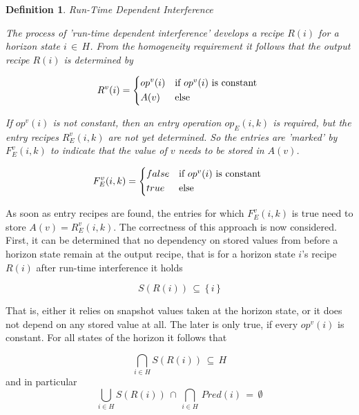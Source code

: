 \documentclass[12pt,a4paper]{scrartcl}
\newtheorem{definition}{Definition}
\begin{document}
\begin{definition}
Run-Time Dependent Interference

The process of 'run-time dependent interference' develops a recipe $R(i)$ for a
horizon state $i\,\in\,H$.  From the homogeneity requirement it follows that
the output recipe $R(i)$ is determined by 
          
\begin{equation}
    R^v(i) = \begin{dcases*}
              op^v(i) & if $op^v(i)$ is constant \\
              A(v)    & else
             \end{dcases*}
\end{equation}

If $op^v(i)$ is not constant, then an entry operation $op_E(i,k)$ is required,
but the entry recipes $R_E^v(i,k)$ are not yet determined. So the entries are
'marked' by $F_E^v(i,k)$ to indicate that the value of $v$ needs to be
stored in $A(v)$.

\begin{equation}
    F_E^v(i,k) = \begin{dcases*}
                     false & if $op^v(i)$ is constant \\
                     true  & else
                 \end{dcases*}
\end{equation}

\end{definition}

As soon as entry recipes are found, the entries for which $F_E^v(i,k)$ is
true need to store $A(v)=R_E^v(i,k)$. The correctness of this approach is now
considered. First, it can be determined that no dependency on stored values 
from before a horizon state remain at the output recipe, that is for a horizon
state $i$'s recipe $R(i)$ after run-time interference it holds

\begin{equation}
                      S(R(i))\,\subseteq\,\{\,i\,\}
\end{equation}

That is, either it relies on snapshot values taken at the horizon state, or it
does not depend on any stored value at all. The later is only true, if every
$op^v(i)$ is constant. For all states of the horizon it follows that

\begin{equation}
                \bigcap_{i \in H}S(R(i))\,\subseteq\,H
\end{equation}
and in particular
\begin{equation}
    \bigcup_{i \in H}S(R(i))\,\cap\,\bigcap_{i \in H}\,Pred(i)\,=\,\emptyset
\end{equation}
\end{document}
